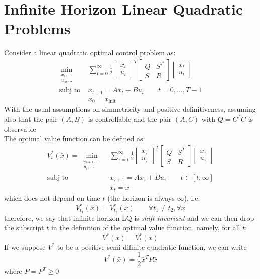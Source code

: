 \documentclass[openany]{book}
\theoremstyle{definition}
\theoremstyle{remark}
\begin{document}
\section{Infinite Horizon Linear Quadratic Problems}
Consider a linear quadratic optimal control problem as: 
\begin{align*}
    \min_{\substack{x_1,\dots \\ u_0,\dots}} & \displaystyle\sum_{t=0}^{\infty} \displaystyle\frac{1}{2}\begin{bmatrix}
        x_t \\ u_t
    \end{bmatrix}^T \begin{bmatrix}
        Q & S^T \\ S & R 
    \end{bmatrix}\begin{bmatrix}
        x_t \\ u_t
    \end{bmatrix}\\
    \text{subj to } & x_{t+1} = Ax_t+ Bu_t \qquad t=0,\dots,T-1\\
    & x_0 = x_{\text{init}}
\end{align*}
With the usual assumptions on simmetricity and positive definitiveness, assuming also that the pair $(A,B)$ is controllable and the pair $(A,C)$ with $Q=C^TC$ is observable\\
The optimal value function can be defined as: 
\begin{align*}
    V_t^*(\bar{x}) = \min_{\substack{x_{t+1},\dots\\u_t,\dots}} &\displaystyle\sum_{\tau=t}^{\infty} \displaystyle\frac{1}{2}\begin{bmatrix}
        x_\tau \\ u_\tau
    \end{bmatrix}^T \begin{bmatrix}
        Q & S^T \\ S & R 
    \end{bmatrix}\begin{bmatrix}
        x_\tau \\ u_\tau
    \end{bmatrix}\\
    \text{subj to } & x_{\tau+1} = Ax_\tau+ Bu_\tau \qquad t\in[t,\infty]\\
    & x_t = \bar{x}
\end{align*}
which does not depend on time $t$ (the horizon is always $\infty$), i.e. 
\[
    V_{t_1}^*(\bar{x})=V_{t_2}^*(\bar{x}) \qquad \forall t_1\neq t_2, \forall \bar{x}
\]
therefore, we say that infinite horizon LQ is \emph{shift invariant} and we can then drop the subscript $t$ in the definition of the optimal value function, namely, for  all $t$: 
\[
    V^*(\bar{x}) = V^*_t(\bar{x})
\]
If we suppose $V^*$ to be a positive semi-difinite quadratic function, we can write 
\[
    V^*(\bar{x}) = \frac{1}{2} \bar{x}^T P\bar{x}
\]
where $P=P^T\geq 0$
\end{document}
